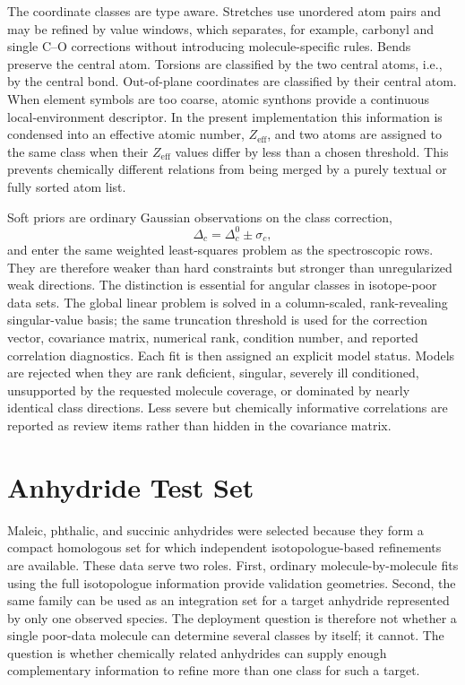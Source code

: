 \documentclass[journal=jpclcd,manuscript=letter]{achemso}
\begin{document}
The coordinate classes are type aware.  Stretches use unordered atom pairs and may be refined by value windows, which separates, for example, carbonyl and single C--O corrections without introducing molecule-specific rules.  Bends preserve the central atom.  Torsions are classified by the two central atoms, i.e., by the central bond.  Out-of-plane coordinates are classified by their central atom.  When element symbols are too coarse, atomic synthons provide a continuous local-environment descriptor.  In the present implementation this information is condensed into an effective atomic number, $Z_\mathrm{eff}$, and two atoms are assigned to the same class when their $Z_\mathrm{eff}$ values differ by less than a chosen threshold.  This prevents chemically different relations from being merged by a purely textual or fully sorted atom list.

Soft priors are ordinary Gaussian observations on the class correction,
\begin{equation}
\Delta_c = \Delta_c^0 \pm \sigma_c ,
\end{equation}
and enter the same weighted least-squares problem as the spectroscopic rows.  They are therefore weaker than hard constraints but stronger than unregularized weak directions.  The distinction is essential for angular classes in isotope-poor data sets.
The global linear problem is solved in a column-scaled, rank-revealing singular-value basis; the same truncation threshold is used for the correction vector, covariance matrix, numerical rank, condition number, and reported correlation diagnostics.
Each fit is then assigned an explicit model status.  Models are rejected when they are rank deficient, singular, severely ill conditioned, unsupported by the requested molecule coverage, or dominated by nearly identical class directions.  Less severe but chemically informative correlations are reported as review items rather than hidden in the covariance matrix.

\section*{Anhydride Test Set}

Maleic, phthalic, and succinic anhydrides were selected because they form a compact homologous set for which independent isotopologue-based refinements are available.  These data serve two roles.  First, ordinary molecule-by-molecule fits using the full isotopologue information provide validation geometries.  Second, the same family can be used as an integration set for a target anhydride represented by only one observed species.  The deployment question is therefore not whether a single poor-data molecule can determine several classes by itself; it cannot.  The question is whether chemically related anhydrides can supply enough complementary information to refine more than one class for such a target.
\end{document}
